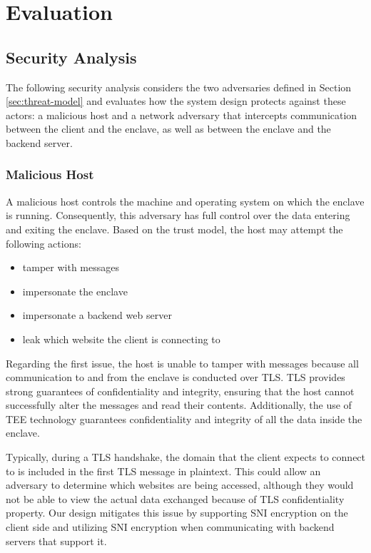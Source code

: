 \chapter{Evaluation}\label{ch:sample-chapter}
\section{Security Analysis}
The following security analysis considers the two adversaries defined in Section \ref{sec:threat-model} and evaluates how the system design protects against these actors: a malicious host and a network adversary that intercepts communication between the client and the enclave, as well as between the enclave and the backend server.

\subsection{Malicious Host}
A malicious host controls the machine and operating system on which the enclave is running. Consequently, this adversary has full control over the data entering and exiting the enclave. Based on the trust model, the host may attempt the following actions:
\begin{itemize}
    \item tamper with messages
    \item impersonate the enclave
    \item impersonate a backend web server
    \item leak which website the client is connecting to
\end{itemize}


Regarding the first issue, the host is unable to tamper with messages because all communication to and from the enclave is conducted over TLS. TLS provides strong guarantees of confidentiality and integrity, ensuring that the host cannot successfully alter the messages and read their contents. Additionally, the use of TEE technology guarantees confidentiality and integrity of all the data inside the enclave. 

Typically, during a TLS handshake, the domain that the client expects to connect to is included in the first TLS message in plaintext. This could allow an adversary to determine which websites are being accessed, although they would not be able to view the actual data exchanged because of TLS confidentiality property. Our design mitigates this issue by supporting SNI encryption on the client side and utilizing SNI encryption when communicating with backend servers that support it.

